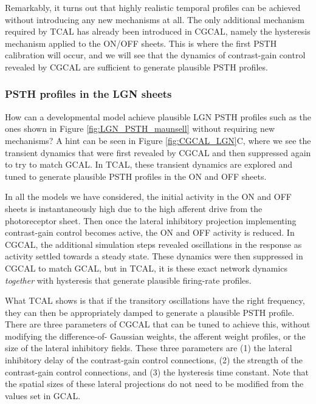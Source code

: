 \documentclass[phd,ianc,twoside]{infthesis}
\begin{document}
Remarkably, it turns out that highly realistic temporal profiles
can be achieved without introducing any new mechanisms
at all. The only additional mechanism required by TCAL has already been
introduced in CGCAL, namely the hysteresis mechanism applied to the
ON/OFF sheets. This is where the first PSTH calibration will occur, and
we will see that the dynamics of contrast-gain control revealed by
CGCAL are sufficient to generate plausible PSTH profiles.

\subsubsection*{PSTH profiles in the LGN sheets}

How can a developmental model achieve plausible LGN PSTH profiles such
as the ones shown in Figure \ref{fig:LGN_PSTH_maunsell} without
requiring new mechanisms? A hint can be seen in Figure
\ref{fig:CGCAL_LGN}C, where we see the transient dynamics that were first
revealed by CGCAL and then suppressed again to try to match GCAL. In
TCAL, these transient dynamics are explored and tuned to generate
plausible PSTH profiles in the ON and OFF sheets.

In all the models we have considered, the initial activity in the ON and
OFF sheets is instantaneously high due to the high afferent drive from
the photoreceptor sheet. Then once the lateral inhibitory projection
implementing contrast-gain control becomes active, the ON and OFF activity is
reduced. In CGCAL, the additional simulation steps revealed oscillations
in the response as activity settled towards a steady state. These
dynamics were then suppressed in CGCAL to match GCAL, but in TCAL, it is
these exact network dynamics \emph{together} with hysteresis that
generate plausible firing-rate profiles.

What TCAL shows is that if the transitory oscillations have the right
frequency, they can then be appropriately damped to generate a plausible
PSTH profile. There are three parameters of CGCAL that can be tuned to
achieve this, without modifying the difference-of- Gaussian weights, the
afferent weight profiles, or the size of the lateral inhibitory
fields. These three parameters are (1) the lateral inhibitory delay of
the contrast-gain control connections, (2) the strength of the
contrast-gain control connections, and (3) the hysteresis time constant. Note
that the spatial sizes of these lateral projections do not need to be
modified from the values set in GCAL.
\end{document}
